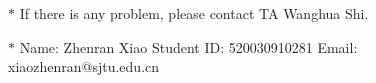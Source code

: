 \documentclass[12pt,a4paper]{article}
\theoremstyle{definition}
\begin{document}
\noindent

\noindent{}
\begin{center}
\footnotesize{\color{red}$*$ If there is any problem, please contact TA Wanghua Shi.}

\footnotesize{\color{blue}$*$ Name: Zhenran Xiao  \quad Student ID: 520030910281 \quad Email: xiaozhenran@sjtu.edu.cn}
\end{center}
\end{document}
